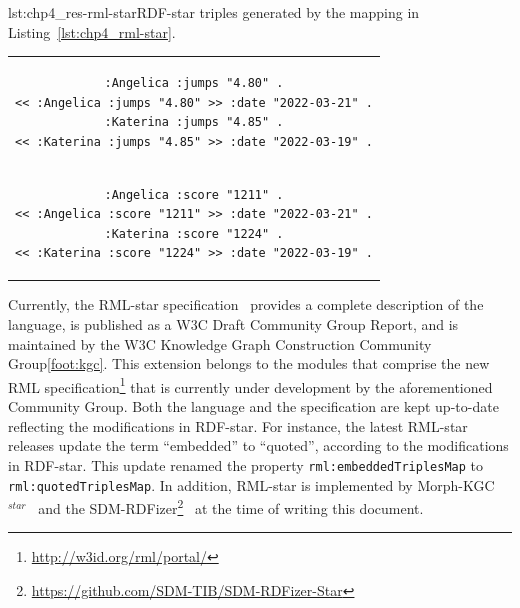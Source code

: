 \noindent\hspace{0.1\linewidth}\begin{minipage}{\linewidth}
\begin{captionedlisting}{lst:chp4_res-rml-star}{RDF-star triples generated by the mapping in Listing~\ref{lst:chp4_rml-star}.}
\centering
\begin{tabular}{c}
\hspace{2em}
{\begin{lstlisting}[basicstyle=\ttfamily\small,label={list:example1},columns=flexible]
:Angelica :jumps "4.80" .
<< :Angelica :jumps "4.80" >> :date "2022-03-21" .
:Katerina :jumps "4.85" .
<< :Katerina :jumps "4.85" >> :date "2022-03-19" .
\end{lstlisting}}\\
\hspace{2em}
{\begin{lstlisting}[basicstyle=\ttfamily\small,label={list:example1},columns=flexible,frame=l,rulecolor=\color{red},framerule=0.75pt,firstnumber=5]
:Angelica :score "1211" .
<< :Angelica :score "1211" >> :date "2022-03-21" .
:Katerina :score "1224" .
<< :Katerina :score "1224" >> :date "2022-03-19" .
\end{lstlisting}}

\end{tabular}
\end{captionedlisting}
\end{minipage}


Currently, the \mbox{RML-star} specification~\parencite{iglesias2022rmlstar} provides a complete description of the language, is published as a W3C Draft Community Group Report, and is maintained by the W3C Knowledge Graph Construction Community Group\cref{foot:kgc}. 
This extension belongs to the modules that comprise the new RML specification\footnote{\label{foot:rml-portal}\url{http://w3id.org/rml/portal/}} that is currently under development by the aforementioned Community Group. 
Both the language and the specification are kept up-to-date reflecting the modifications in \mbox{RDF-star}.
For instance, the latest \mbox{RML-star} releases update the term ``embedded'' to ``quoted'',
according to the modifications in \mbox{RDF-star}.
This update renamed the property \texttt{rml:embeddedTriplesMap} to \texttt{rml:quotedTriplesMap}.
In addition, RML-star is implemented by Morph-KGC$^{star}$~\parencite{arenas2023morphstar} and the SDM-RDFizer\footnote{\url{https://github.com/SDM-TIB/SDM-RDFizer-Star}}~\parencite{iglesias2020rdfizer} at the time of writing this document.




